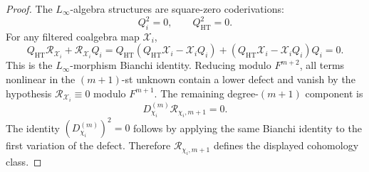\begin{proof}
The \(L_\infty\)-algebra structures are square-zero coderivations:
\[
  Q_i^2=0,\qquad Q_{\mathrm{HT}}^2=0 .
\]
For any filtered coalgebra map \(\mathcal X_i\),
\[
  Q_{\mathrm{HT}}\mathcal R_{\mathcal X_i}
  +\mathcal R_{\mathcal X_i}Q_i
  =
  Q_{\mathrm{HT}}(Q_{\mathrm{HT}}\mathcal X_i-\mathcal X_iQ_i)
  +(Q_{\mathrm{HT}}\mathcal X_i-\mathcal X_iQ_i)Q_i
  =
  0 .
\]
This is the \(L_\infty\)-morphism Bianchi identity.  Reducing modulo
\(F^{m+2}\), all terms nonlinear in the \((m+1)\)-st unknown contain a
lower defect and vanish by the hypothesis
\(\mathcal R_{\mathcal X_i}\equiv0\) modulo \(F^{m+1}\).  The remaining
degree-\((m+1)\) component is
\[
  D^{(m)}_{\chi_i}\mathcal R_{\chi_i,m+1}=0 .
\]
The identity \((D^{(m)}_{\chi_i})^2=0\) follows by applying the same
Bianchi identity to the first variation of the defect.  Therefore
\(\mathcal R_{\chi_i,m+1}\) defines the displayed cohomology class.
\end{proof}

